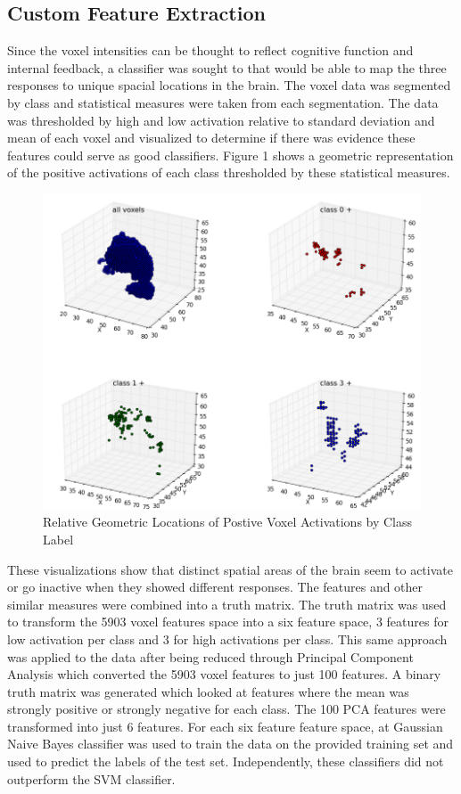 \documentclass{article} %
\begin{document}
\subsection{Custom Feature Extraction}
Since the voxel intensities can be thought to reflect cognitive function and internal feedback, a classifier was sought to that would be able to map the three responses to unique spacial locations in the brain. The voxel data was segmented by class and statistical measures were taken from each segmentation. The data was thresholded by high  and low activation relative to standard deviation and mean of each voxel and visualized to determine if there was evidence these features could serve as good classifiers. Figure 1 shows a geometric representation of the positive activations of each class thresholded by these statistical measures.

\begin{figure}[h]
	\begin{center}
		\includegraphics[scale=.35]{media/pos_4x4_formatted.png}
	\end{center}
	\caption{Relative Geometric Locations of Postive Voxel Activations by Class Label}
\end{figure}

These visualizations show that distinct spatial areas of the brain seem to activate or go inactive when they showed different responses.  The features and other similar measures were combined into a truth matrix. The truth matrix was used to transform the 5903 voxel features space into a six feature space, 3 features for low activation per class and 3 for high activations per class.
This same approach was applied to the data after being reduced through Principal Component Analysis which converted the 5903 voxel features to just 100 features.  A binary truth matrix was generated which looked at features where the mean was strongly positive or strongly negative for each class. The 100 PCA features were transformed into just 6 features.
For each six feature feature space, at Gaussian Naive Bayes classifier was used to train the data on the provided training set and used to predict the labels of the test set. Independently, these classifiers did not outperform the SVM classifier.
\end{document}
